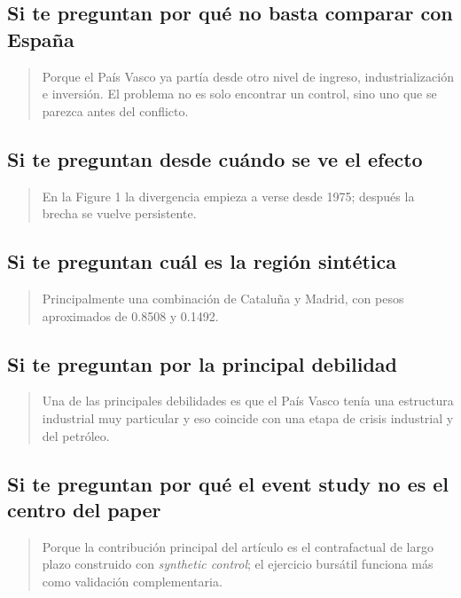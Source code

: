 \documentclass[11pt]{article}
\begin{document}
\subsection*{Si te preguntan por qué no basta comparar con España}

\begin{quote}
Porque el País Vasco ya partía desde otro nivel de ingreso, industrialización e inversión. El problema no es solo encontrar un control, sino uno que se parezca antes del conflicto.
\end{quote}

\subsection*{Si te preguntan desde cuándo se ve el efecto}

\begin{quote}
En la Figure 1 la divergencia empieza a verse desde 1975; después la brecha se vuelve persistente.
\end{quote}

\subsection*{Si te preguntan cuál es la región sintética}

\begin{quote}
Principalmente una combinación de Cataluña y Madrid, con pesos aproximados de 0.8508 y 0.1492.
\end{quote}

\subsection*{Si te preguntan por la principal debilidad}

\begin{quote}
Una de las principales debilidades es que el País Vasco tenía una estructura industrial muy particular y eso coincide con una etapa de crisis industrial y del petróleo.
\end{quote}

\subsection*{Si te preguntan por qué el event study no es el centro del paper}

\begin{quote}
Porque la contribución principal del artículo es el contrafactual de largo plazo construido con \emph{synthetic control}; el ejercicio bursátil funciona más como validación complementaria.
\end{quote}
\end{document}
